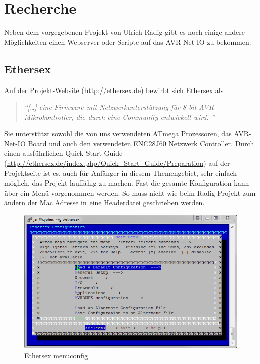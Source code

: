 \chapter{Recherche}

Neben dem vorgegebenen Projekt von Ulrich Radig gibt es noch einige andere
Möglichkeiten einen Webserver oder Scripte auf das AVR-Net-IO zu bekommen.

\section{Ethersex}

Auf der Projekt-Website (\url{http://ethersex.de}) bewirbt sich Ethersex als
\begin{quote} \textit{
		\enquote{[\ldots] eine Firmware mit Netzwerkunterstützung für 8-bit AVR
		Mikrokontroller, die durch eine Community entwickelt wird.  }
	}
	\cite{Ethersex}
\end{quote}

Sie unterstützt sowohl die von uns verwendeten ATmega Prozessoren, das
AVR-Net-IO Board und auch den verwendeten ENC28J60 Netzwerk Controller.
Durch einen ausführlichen Quick Start Guide
(\url{http://ethersex.de/index.php/Quick_Start_Guide/Preparation}) auf der
Projektseite ist es, auch für Anfänger in diesem Themengebiet, sehr einfach möglich, das Projekt lauffähig zu machen. 
Fast die gesamte Konfiguration kann über ein Menü vorgenommen werden. So muss nicht wie beim Radig Projekt zum
ändern der Mac Adresse in eine Headerdatei geschrieben werden. 

\begin{figure}[H]
	\centering
		\includegraphics[width=13cm]{content/pictures/Recherche/Ethersex/Ehtersex1.png}
	\caption{Ethersex menuconfig}
	\label{Ethersex1}
\end{figure} 

